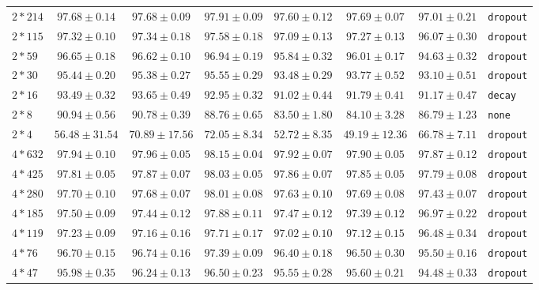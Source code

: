 \documentclass[conference]{IEEEtran}
\begin{document}
\begin{longtable}{@{}lccccccl@{}}
$2*214$ & $97.68 \pm 0.14$ & $97.68 \pm 0.09$ & \bfseries $97.91 \pm 0.09$ & $97.60 \pm 0.12$ & $97.69 \pm 0.07$ & $97.01 \pm 0.21$ & \texttt{dropout} \\
$2*115$ & $97.32 \pm 0.10$ & $97.34 \pm 0.18$ & \bfseries $97.58 \pm 0.18$ & $97.09 \pm 0.13$ & $97.27 \pm 0.13$ & $96.07 \pm 0.30$ & \texttt{dropout} \\
$2*59$ & $96.65 \pm 0.18$ & $96.62 \pm 0.10$ & \bfseries $96.94 \pm 0.19$ & $95.84 \pm 0.32$ & $96.01 \pm 0.17$ & $94.63 \pm 0.32$ & \texttt{dropout} \\
$2*30$ & $95.44 \pm 0.20$ & $95.38 \pm 0.27$ & \bfseries $95.55 \pm 0.29$ & $93.48 \pm 0.29$ & $93.77 \pm 0.52$ & $93.10 \pm 0.51$ & \texttt{dropout} \\
$2*16$ & $93.49 \pm 0.32$ & \bfseries $93.65 \pm 0.49$ & $92.95 \pm 0.32$ & $91.02 \pm 0.44$ & $91.79 \pm 0.41$ & $91.17 \pm 0.47$ & \texttt{decay} \\
$2*8$ & \bfseries $90.94 \pm 0.56$ & $90.78 \pm 0.39$ & $88.76 \pm 0.65$ & $83.50 \pm 1.80$ & $84.10 \pm 3.28$ & $86.79 \pm 1.23$ & \texttt{none} \\
$2*4$ & $56.48 \pm 31.54$ & $70.89 \pm 17.56$ & \bfseries $72.05 \pm 8.34$ & $52.72 \pm 8.35$ & $49.19 \pm 12.36$ & $66.78 \pm 7.11$ & \texttt{dropout} \\
$4*632$ & $97.94 \pm 0.10$ & $97.96 \pm 0.05$ & \bfseries $98.15 \pm 0.04$ & $97.92 \pm 0.07$ & $97.90 \pm 0.05$ & $97.87 \pm 0.12$ & \texttt{dropout} \\
$4*425$ & $97.81 \pm 0.05$ & $97.87 \pm 0.07$ & \bfseries $98.03 \pm 0.05$ & $97.86 \pm 0.07$ & $97.85 \pm 0.05$ & $97.79 \pm 0.08$ & \texttt{dropout} \\
$4*280$ & $97.70 \pm 0.10$ & $97.68 \pm 0.07$ & \bfseries $98.01 \pm 0.08$ & $97.63 \pm 0.10$ & $97.69 \pm 0.08$ & $97.43 \pm 0.07$ & \texttt{dropout} \\
$4*185$ & $97.50 \pm 0.09$ & $97.44 \pm 0.12$ & \bfseries $97.88 \pm 0.11$ & $97.47 \pm 0.12$ & $97.39 \pm 0.12$ & $96.97 \pm 0.22$ & \texttt{dropout} \\
$4*119$ & $97.23 \pm 0.09$ & $97.16 \pm 0.16$ & \bfseries $97.71 \pm 0.17$ & $97.02 \pm 0.10$ & $97.12 \pm 0.15$ & $96.48 \pm 0.34$ & \texttt{dropout} \\
$4*76$ & $96.70 \pm 0.15$ & $96.74 \pm 0.16$ & \bfseries $97.39 \pm 0.09$ & $96.40 \pm 0.18$ & $96.50 \pm 0.30$ & $95.50 \pm 0.16$ & \texttt{dropout} \\
$4*47$ & $95.98 \pm 0.35$ & $96.24 \pm 0.13$ & \bfseries $96.50 \pm 0.23$ & $95.55 \pm 0.28$ & $95.60 \pm 0.21$ & $94.48 \pm 0.33$ & \texttt{dropout} \\

\end{longtable}
\end{document}

